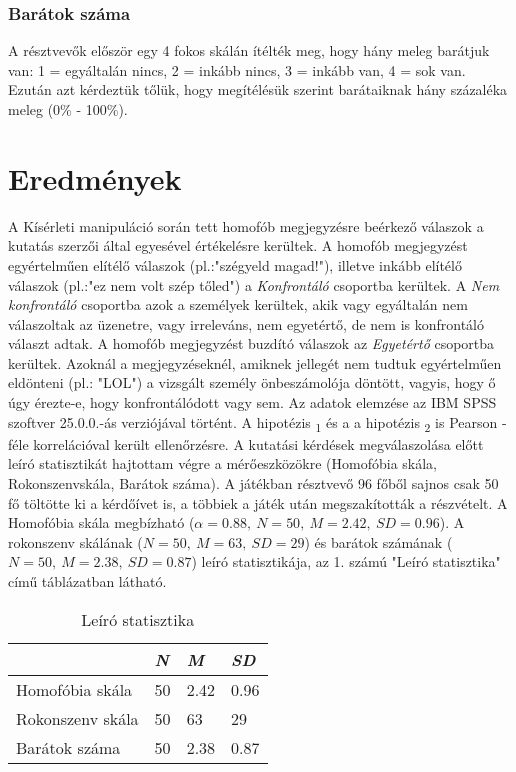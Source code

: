\subsubsection{Barátok száma}
A résztvevők először egy 4 fokos skálán ítélték meg, hogy hány meleg barátjuk van: 1 = egyáltalán nincs, 2 = inkább nincs, 3 = inkább van, 4 = sok van. Ezután azt kérdeztük tőlük, hogy megítélésük szerint barátaiknak hány százaléka meleg (0\% - 100\%).

\pagebreak
\section{Eredmények}
A Kísérleti manipuláció során tett homofób megjegyzésre beérkező válaszok a kutatás szerzői  által egyesével értékelésre kerültek. A homofób megjegyzést egyértelműen elítélő válaszok (pl.:"szégyeld magad!"), illetve inkább elítélő válaszok (pl.:"ez nem volt szép tőled") a \textit{Konfrontáló} csoportba kerültek. A \textit{Nem konfrontáló} csoportba azok a személyek kerültek, akik vagy egyáltalán nem válaszoltak az üzenetre, vagy irreleváns, nem egyetértő, de nem is konfrontáló választ adtak. A homofób megjegyzést buzdító válaszok az \textit{Egyetértő} csoportba kerültek. Azoknál a megjegyzéseknél, amiknek jellegét nem tudtuk egyértelműen eldönteni (pl.: "LOL") a vizsgált személy önbeszámolója döntött, vagyis, hogy ő úgy érezte-e, hogy konfrontálódott vagy sem.
Az adatok elemzése az IBM SPSS szoftver 25.0.0.-ás verziójával történt. A hipotézis \textsubscript{1} és a a hipotézis \textsubscript{2} is Pearson -féle korrelációval került ellenőrzésre.
A kutatási kérdések megválaszolása előtt leíró statisztikát hajtottam végre a mérőeszközökre (Homofóbia skála, Rokonszenvskála, Barátok száma). A játékban résztvevő 96 főből sajnos csak 50 fő töltötte ki a kérdőívet is, a többiek a játék után megszakították a részvételt. A Homofóbia skála megbízható ($\alpha=0.88,\  N=50, \  M=2.42, \ SD=0.96$). A rokonszenv skálának ($N=50,\  M=63,\  SD=29$) és barátok számának ($N=50, \ M=2.38, \ SD=0.87$) leíró statisztikája, az 1. számú "Leíró statisztika" című táblázatban látható.
\begin{table}[h]
	\centering
	\begin{tabular}{|l|l|l|l|}
		\hline
		& \textit{N}  & \textit{M}    & \textit{SD}   \\ \hline
		Homofóbia skála  & 50 & 2.42 & 0.96 \\ \hline
		Rokonszenv skála & 50 & 63   & 29   \\ \hline
		Barátok száma    & 50 & 2.38 & 0.87 \\ \hline
	\end{tabular}
	\caption{Leíró statisztika}
	\label{table:1}
\end{table}

